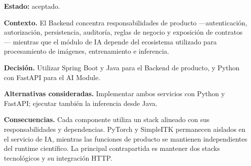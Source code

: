 \textbf{Estado:} aceptado.

\textbf{Contexto.} El Backend concentra responsabilidades de producto —autenticación, autorización, persistencia, auditoría, reglas de negocio y exposición de contratos— mientras que el módulo de IA depende del ecosistema utilizado para procesamiento de imágenes, entrenamiento e inferencia.

\textbf{Decisión.} Utilizar Spring Boot y Java para el Backend de producto, y Python con FastAPI para el AI Module.

\textbf{Alternativas consideradas.} Implementar ambos servicios con Python y FastAPI; ejecutar también la inferencia desde Java.

\textbf{Consecuencias.} Cada componente utiliza un stack alineado con sus responsabilidades y dependencias. PyTorch y SimpleITK permanecen aislados en el servicio de IA, mientras las funciones de producto se mantienen independientes del runtime científico. La principal contrapartida es mantener dos stacks tecnológicos y su integración HTTP.

